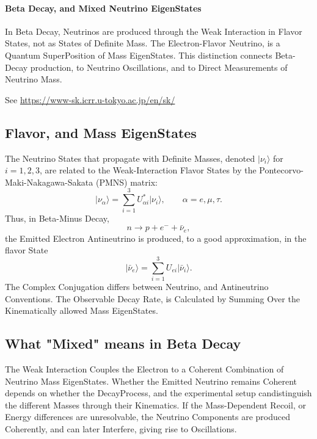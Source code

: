 \documentclass[a4paper, 10pt, onepage]{elegantbook}
\begin{document}
{\paragraph{Beta Decay, and Mixed Neutrino EigenStates}

\noindent

In Beta Decay, Neutrinos are produced through the Weak Interaction in Flavor States, not as States of Definite Mass. 
The Electron-Flavor Neutrino, is a Quantum SuperPosition of Mass EigenStates. This distinction connects Beta-Decay 
production, to Neutrino Oscillations, and to Direct Measurements of Neutrino Mass.  

See \url{https://www-sk.icrr.u-tokyo.ac.jp/en/sk/}  

\noindent

\subsection{Flavor, and Mass EigenStates}

The Neutrino States that propagate with Definite Masses, denoted $\lvert \nu_i\rangle$ for $i=1,2,3$, are related to 
the Weak-Interaction Flavor States by the Pontecorvo-Maki-Nakagawa-Sakata (PMNS) matrix:  
\begin{equation}
  \lvert \nu_\alpha\rangle
  = \sum_{i=1}^{3} U_{\alpha i}^{*}\lvert \nu_i\rangle,
  \qquad \alpha=e,\mu,\tau.
\end{equation}
Thus, in Beta-Minus Decay,
\begin{equation}
  n \longrightarrow p + e^- + \bar{\nu}_e,
\end{equation}
the Emitted Electron Antineutrino is produced, to a good approximation, in the flavor State
\begin{equation}
  \lvert \bar{\nu}_e\rangle
  = \sum_{i=1}^{3} U_{ei}\lvert \bar{\nu}_i\rangle.
\end{equation}
The Complex Conjugation differs between Neutrino, and Antineutrino Conventions. The Observable Decay Rate, is 
Calculated by Summing Over the Kinematically allowed Mass EigenStates.  

\noindent

\subsection{What "Mixed" means in Beta Decay} 

\noindent

The Weak Interaction Couples the Electron to a Coherent Combination of Neutrino Mass EigenStates. Whether the Emitted 
Neutrino remains Coherent depends on whether the DecayProcess, and the experimental setup candistinguish the different 
Masses through their Kinematics. If the Mass-Dependent Recoil, or Energy differences are unresolvable, the Neutrino 
Components are produced Coherently, and can later Interfere, giving rise to Oscillations.  

}
\end{document}
